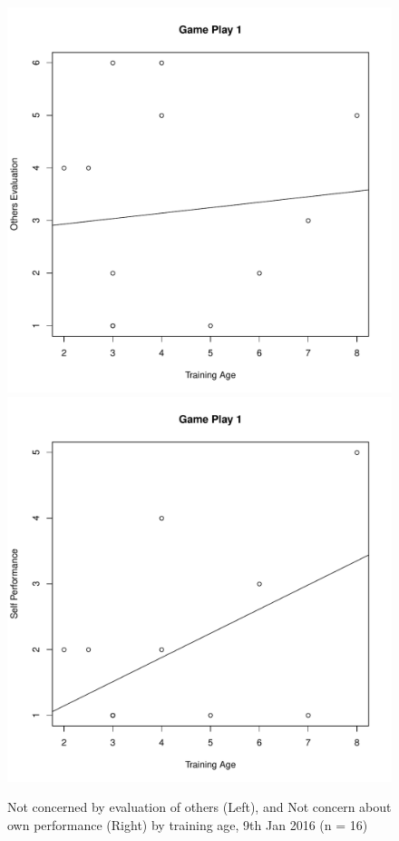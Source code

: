 \begin{CJK}{UTF8}{gbsn}
\begin{figure}[htbp]
  \centering
\includegraphics[scale=.2]{images/othersEval0109TrainingAge.pdf}
\includegraphics[scale=.2]{images/indPerf0109TrainingAge.pdf}
  \caption{Not concerned by evaluation of others (Left), and Not concern about own performance (Right) by training age,  9th Jan 2016 (n = 16)}
  \label{fig:othersEvalIndPerf0109TrainingAge}
\end{figure}



\end{CJK}
